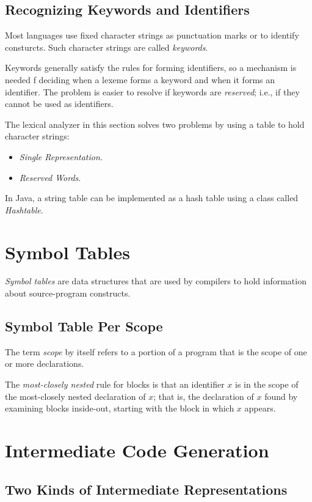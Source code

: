 \documentclass[12pt,a4paper,twoside,openany]{book}
\begin{document}
\subsection{Recognizing Keywords and Identifiers}

Most languages use fixed character strings as punctuation marks or to identify consturcts. Such character strings are called \textit{keywords}.

Keywords generally satisfy the rules for forming identifiers, so a mechanism is needed f deciding when a lexeme forms a keyword and when it forms an identifier. The problem is easier to resolve if keywords are \textit{reserved}; i.e., if they cannot be used as identifiers.

The lexical analyzer in this section solves two problems by using a table to hold character strings:
\begin{itemize}
    \item\textit{Single Representation.}
    \item\textit{Reserved Words}.
\end{itemize}

In Java, a string table can be implemented as a hash table using a class called \textit{Hashtable}.

\section{Symbol Tables}

\textit{Symbol tables} are data structures that are used by compilers to hold information about source-program constructs.

\subsection{Symbol Table Per Scope}

The term \textit{scope} by itself refers to a portion of a program that is the scope of one or more declarations.

The \textit{most-closely nested} rule for blocks is that an identifier $x$ is in the scope of the most-closely nested declaration of $x$; that is, the declaration of $x$ found by examining blocks inside-out, starting with the block in which $x$ appears.

\section{Intermediate Code Generation}
\subsection{Two Kinds of Intermediate Representations}
\end{document}
